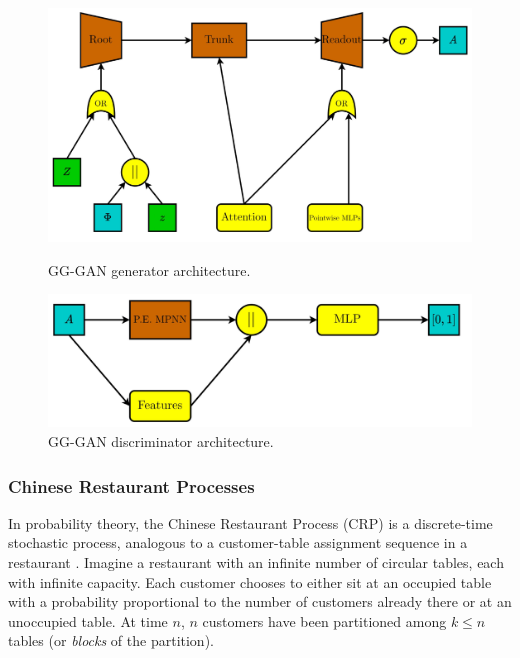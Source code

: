 \begin{figure}
    \centering
    \begin{minipage}{0.475\textwidth}
    \centering
    \includegraphics[width=\textwidth]{figures/gggcrp/gg_gan_g.pdf}
    \caption{GG-GAN generator architecture.}
    \label{fig:gg_gan_g}    
    \end{minipage}
    \hfill
    \begin{minipage}{0.475\textwidth}
    \centering
    \includegraphics[width=\textwidth]{figures/gggcrp/gg_gan_d.pdf}
    \caption{GG-GAN discriminator architecture.}
    \label{fig:gg_gan_d}    
    \end{minipage}
\end{figure}

\subsubsection{Chinese Restaurant Processes}
In probability theory, the Chinese Restaurant Process (CRP) is a discrete-time stochastic process, analogous to a customer-table assignment sequence in a restaurant \cite{aldous_exchangeability_1985}. Imagine a restaurant with an infinite number of circular tables, each with infinite capacity. Each customer chooses to either sit at an occupied table with a probability proportional to the number of customers already there or at an unoccupied table. At time $n$, $n$ customers have been partitioned among $k \leq n$ tables (or \emph{blocks} of the partition).

